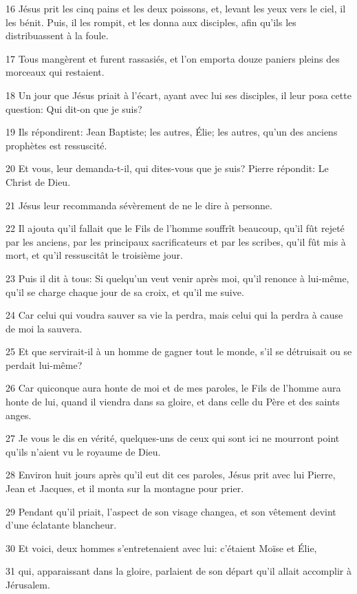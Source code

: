 \par 16 Jésus prit les cinq pains et les deux poissons, et, levant les yeux vers le ciel, il les bénit. Puis, il les rompit, et les donna aux disciples, afin qu'ils les distribuassent à la foule.
\par 17 Tous mangèrent et furent rassasiés, et l'on emporta douze paniers pleins des morceaux qui restaient.
\par 18 Un jour que Jésus priait à l'écart, ayant avec lui ses disciples, il leur posa cette question: Qui dit-on que je suis?
\par 19 Ils répondirent: Jean Baptiste; les autres, Élie; les autres, qu'un des anciens prophètes est ressuscité.
\par 20 Et vous, leur demanda-t-il, qui dites-vous que je suis? Pierre répondit: Le Christ de Dieu.
\par 21 Jésus leur recommanda sévèrement de ne le dire à personne.
\par 22 Il ajouta qu'il fallait que le Fils de l'homme souffrît beaucoup, qu'il fût rejeté par les anciens, par les principaux sacrificateurs et par les scribes, qu'il fût mis à mort, et qu'il ressuscitât le troisième jour.
\par 23 Puis il dit à tous: Si quelqu'un veut venir après moi, qu'il renonce à lui-même, qu'il se charge chaque jour de sa croix, et qu'il me suive.
\par 24 Car celui qui voudra sauver sa vie la perdra, mais celui qui la perdra à cause de moi la sauvera.
\par 25 Et que servirait-il à un homme de gagner tout le monde, s'il se détruisait ou se perdait lui-même?
\par 26 Car quiconque aura honte de moi et de mes paroles, le Fils de l'homme aura honte de lui, quand il viendra dans sa gloire, et dans celle du Père et des saints anges.
\par 27 Je vous le dis en vérité, quelques-uns de ceux qui sont ici ne mourront point qu'ils n'aient vu le royaume de Dieu.
\par 28 Environ huit jours après qu'il eut dit ces paroles, Jésus prit avec lui Pierre, Jean et Jacques, et il monta sur la montagne pour prier.
\par 29 Pendant qu'il priait, l'aspect de son visage changea, et son vêtement devint d'une éclatante blancheur.
\par 30 Et voici, deux hommes s'entretenaient avec lui: c'étaient Moïse et Élie,
\par 31 qui, apparaissant dans la gloire, parlaient de son départ qu'il allait accomplir à Jérusalem.
